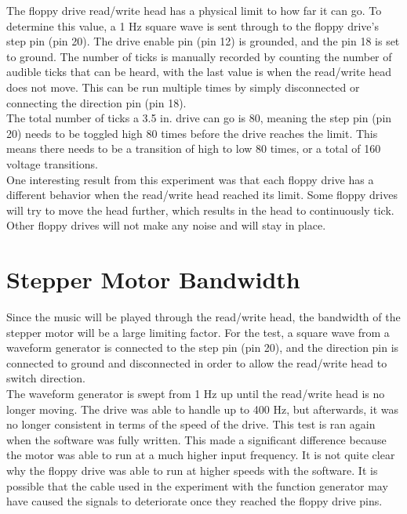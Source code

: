 \documentclass[11pt, a4paper]{report}
\begin{document}
The floppy drive read/write head has a physical limit to how far it can go. To determine this value, a 1 Hz square wave is sent through to the floppy drive's step pin (pin 20). The drive enable pin (pin 12) is grounded, and the pin 18 is set to ground. The number of ticks is manually recorded by counting the number of audible ticks that can be heard, with the last value is when the read/write head does not move. This can be run multiple times by simply disconnected or connecting the direction pin (pin 18). \\

The total number of ticks a 3.5 in. drive can go is 80, meaning the step pin (pin 20) needs to be toggled high 80 times before the drive reaches the limit. This means there needs to be a transition of high to low 80 times, or a total of 160 voltage transitions. \\

One interesting result from this experiment was that each floppy drive has a different behavior when the read/write head reached its limit. Some floppy drives will try to move the head further, which results in the head to continuously tick. Other floppy drives will not make any noise and will stay in place.

\section{Stepper Motor Bandwidth}

Since the music will be played through the read/write head, the bandwidth of the stepper motor will be a large limiting factor. For the test, a square wave from a waveform generator is connected to the step pin (pin 20), and the direction pin is connected to ground and disconnected in order to allow the read/write head to switch direction. \\

The waveform generator is swept from 1 Hz up until the read/write head is no longer moving. The drive was able to handle up to 400 Hz, but afterwards, it was no longer consistent in terms of the speed of the drive. This test is ran again when the software was fully written. This made a significant difference because the motor was able to run at a much higher input frequency. It is not quite clear why the floppy drive was able to run at higher speeds with the software. It is possible that the cable used in the experiment with the function generator may have caused the signals to deteriorate once they reached the floppy drive pins. \\ 
\end{document}
